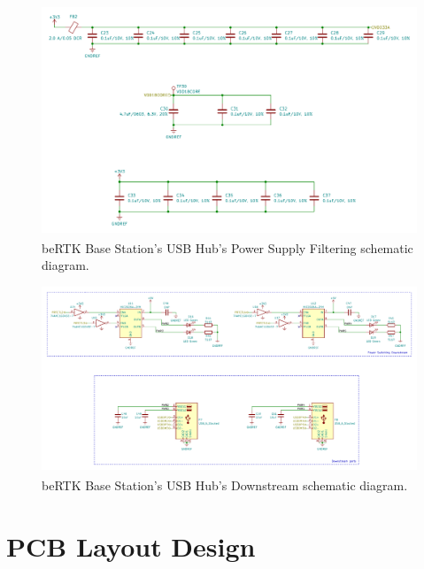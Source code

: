 \begin{figure}[h]
	\centering
	\includegraphics[width=1.0\textwidth]{Chapters/Figures/chapter3/USB_Hub_PwrSplyFiltering.pdf}
	\caption{beRTK\textsuperscript{\textregistered} Base Station's USB Hub's Power Supply Filtering schematic diagram.}
	\label{fig:USB_Hub_PwrSplyFiltering_circuit}
\end{figure}

\begin{figure}[h]
	\centering
	\includegraphics[width=1.0\textwidth]{Chapters/Figures/chapter3/USB_Hub_Downstream.pdf}
	\caption{beRTK\textsuperscript{\textregistered} Base Station's USB Hub's Downstream schematic diagram.}
	\label{fig:USB_Hub_Downstream_circuit}
\end{figure}

\section{PCB Layout Design}\label{sec:33_PCBlayout}

